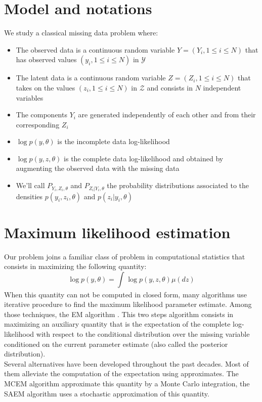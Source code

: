 \documentclass{article}
\begin{document}
\section{Model and notations}
We study a classical missing data problem where:
\begin{itemize}
\item The observed data is a continuous random variable $Y = (Y_i, 1\leq i \leq N)$ that has observed values $(y_i, 1\leq i \leq N)$ in $\mathcal{Y}$
\item The latent data is a continuous random variable $Z = (Z_i, 1\leq i \leq N)$ that takes on the values $(z_i, 1\leq i \leq N)$ in $\mathcal{Z}$ and consists in $N$ independent variables
\item The components $Y_i$ are generated independently of each other and from their corresponding $Z_i$
\item $\log p(y,\theta)$ is the incomplete data log-likelihood
\item $\log p(y,z,\theta)$ is the complete data log-likelihood and obtained by augmenting the observed data with the missing data
\item We'll call $P_{Y_i,Z_i,\theta}$ and $P_{Z_i|Y_i,\theta}$ the probability distributions associated to the densities $p(y_i,z_i,\theta)$ and $p(z_i|y_i,\theta)$
\end{itemize}



\section{Maximum likelihood estimation}
Our problem joins a familiar class of problem in computational statistics that consists in maximizing the following quantity:
\begin{equation}
\log p(y,\theta) = \int_{}{\log p(y,z,\theta)\mu(dz)}
\end{equation}
When this quantity can not be computed in closed form, many algorithms use iterative procedure to find the maximum likelihood parameter estimate. Among those techniques, the EM algorithm \citep{dempster}. This two steps algorithm consists in maximizing an auxiliary quantity that is the expectation of the complete log-likelihood with respect to the conditional distribution over the missing variable conditioned on the current parameter estimate (also called the posterior distribution).\\
Several alternatives have been developed throughout the past decades. Most of them alleviate the computation of the expectation using approximates. The MCEM algorithm \citep{diebolt} approximate this quantity by a Monte Carlo integration, the SAEM algorithm \citep{lavielle} uses a stochastic approximation of this quantity.\\
\end{document}
